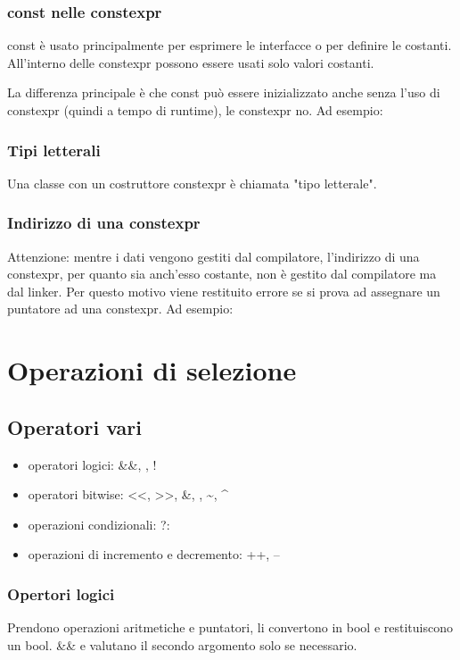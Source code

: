 \documentclass[11pt,a4paper]{book}
\begin{document}
\subsection{const nelle constexpr}
const è usato principalmente per esprimere le interfacce o per definire le costanti. All'interno delle constexpr possono essere usati solo valori costanti.

La differenza principale è che const può essere inizializzato anche senza l'uso di constexpr (quindi a tempo di runtime), le constexpr no. Ad esempio:
\label{code: 152}

\subsection{Tipi letterali}
Una classe con un costruttore constexpr è chiamata "tipo letterale".

\subsection{Indirizzo di una constexpr}
Attenzione: mentre i dati vengono gestiti dal compilatore, l'indirizzo di una constexpr, per quanto sia anch'esso costante, non è gestito dal compilatore ma dal linker. Per questo motivo viene restituito errore se si prova ad assegnare un puntatore ad una constexpr. Ad esempio:
\label{code: 153}

\chapter{Operazioni di selezione}
\section{Operatori vari}
\begin{itemize}
	\item operatori logici: \&\&, \mid\mid, !
	\item operatori bitwise: <<, >>, \&, \mid, \sim, \^
	\item operazioni condizionali: ?:
	\item operazioni di incremento e decremento: ++, --
\end{itemize}
\subsection{Opertori logici}
Prendono operazioni aritmetiche e puntatori, li convertono in bool e restituiscono un bool. \&\& e \mid\mid valutano il secondo argomento solo se necessario.
\end{document}
